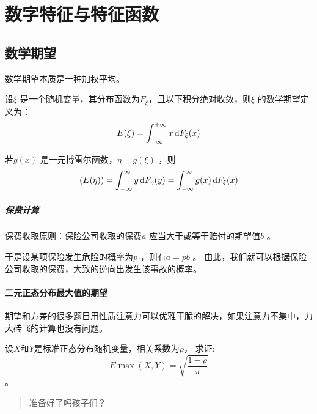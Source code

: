 \chapter{数字特征与特征函数}
\section{数学期望}
数学期望本质是一种加权平均。

\begin{definition}[数学期望]
    设\(\xi\) 是一个随机变量，其分布函数为\(F_{\xi}\)，且以下积分绝对收敛，则\(\xi\) 的数学期望定义为：
    \[
        E(\xi) = \int_{-\infty}^{+\infty} x \d{F_{\xi}}(x)
    \]
\end{definition}


\begin{theorem}[佚名统计学家公式]
    若\(g(x)\) 是一元博雷尔函数，\(\eta=g(\xi)\) ，则\[
        (E(\eta)) = \int_{-\infty}^{\infty} y \d{F_{\eta}}(y) =
        \int_{-\infty}^{\infty} g(x) \d{F_{\xi}}(x)
    \]
\end{theorem}

\paragraph{保费计算}
保费收取原则：保险公司收取的保费\(a\) 应当大于或等于赔付的期望值\(b\) 。

于是设某项保险发生危险的概率为\(p\) ，则有\(a=pb\) 。
由此，我们就可以根据保险公司收取的保费，大致的逆向出发生该事故的概率。

\subsubsection{二元正态分布最大值的期望}
期望和方差的很多题目用性质\underline{注意力}可以优雅干脆的解决，如果注意力不集中，力大砖飞的计算也没有问题。

\begin{problem}[二元正态分布最大值的期望]
    设\(X\)和\(Y\)是标准正态分布随机变量，相关系数为\(\rho\)，
    求证:\[E\max(X,Y)= \sqrt{\frac{1-\rho}{\pi}}\]。
\end{problem}

\begin{quote}
    准备好了吗孩子们？
\end{quote}

